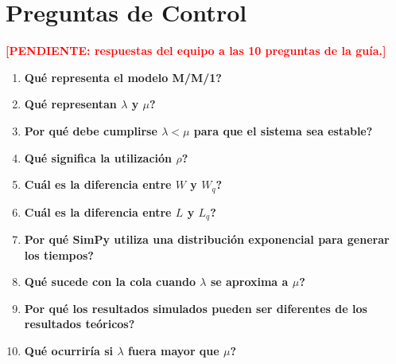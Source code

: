 \documentclass[11pt,a4paper]{article}
\newcommand{\pendiente}[1]{\textcolor{red}{\textbf{[PENDIENTE: #1]}}}
\begin{document}
\section{Preguntas de Control}

\noindent\pendiente{respuestas del equipo a las 10 preguntas de la guía.}

\begin{enumerate}
    \item \textbf{\textquestiondown{}Qué representa el modelo M/M/1?}
    \par\vspace{1.5em}
    \item \textbf{\textquestiondown{}Qué representan $\lambda$ y $\mu$?}
    \par\vspace{1.5em}
    \item \textbf{\textquestiondown{}Por qué debe cumplirse $\lambda < \mu$ para que el
    sistema sea estable?}
    \par\vspace{1.5em}
    \item \textbf{\textquestiondown{}Qué significa la utilización $\rho$?}
    \par\vspace{1.5em}
    \item \textbf{\textquestiondown{}Cuál es la diferencia entre $W$ y $W_q$?}
    \par\vspace{1.5em}
    \item \textbf{\textquestiondown{}Cuál es la diferencia entre $L$ y $L_q$?}
    \par\vspace{1.5em}
    \item \textbf{\textquestiondown{}Por qué SimPy utiliza una distribución exponencial
    para generar los tiempos?}
    \par\vspace{1.5em}
    \item \textbf{\textquestiondown{}Qué sucede con la cola cuando $\lambda$ se aproxima
    a $\mu$?}
    \par\vspace{1.5em}
    \item \textbf{\textquestiondown{}Por qué los resultados simulados pueden ser
    diferentes de los resultados teóricos?}
    \par\vspace{1.5em}
    \item \textbf{\textquestiondown{}Qué ocurriría si $\lambda$ fuera mayor que $\mu$?}
    \par\vspace{1.5em}
\end{enumerate}
\end{document}
